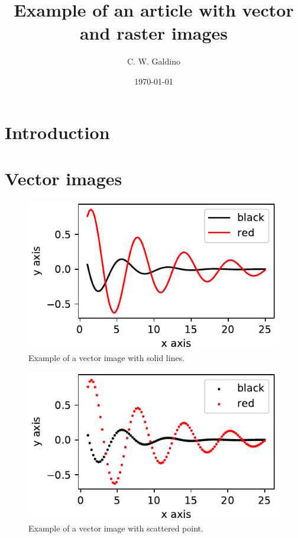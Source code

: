\documentclass[aps, prb, twocolumn, superscriptaddress, amsmath, amssymb]{revtex4-2}
\begin{document}
\title{Example of an article with vector and raster images}

\author{C. W. Galdino}


\date{\today}

\begin{abstract}
\lipsum[1]
\end{abstract}

\maketitle

\section{Introduction}

\lipsum[1]




\section{Vector images}
\lipsum[3]

\begin{figure}
	\centering
	\includegraphics{vector_solid}
	\caption{Example of a vector image with solid lines.}
	\label{vector_solid}
\end{figure}

\lipsum[4]

\begin{figure}
	\centering
	\includegraphics{vector_scatter}
	\caption{Example of a vector image with scattered point.}
	\label{vector_scatter}
\end{figure}
\end{document}

